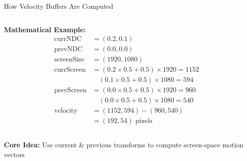 \documentclass[aspectratio=169]{beamer}
\begin{document}
\begin{frame}[fragile,shrink=2]{How Velocity Buffers Are Computed}
\begin{columns}[t]
        \begin{column}{0.36\textwidth}  %
            \textbf{\scriptsize Mathematical Example:}
            \vspace{0.1cm}
            {\scriptsize
            \begin{align*}
                \text{currNDC} &= (0.2, 0.1) \\
                \text{prevNDC} &= (0.0, 0.0) \\
                \text{screenSize} &= (1920, 1080) \\[0.05cm]
                \text{currScreen} &= (0.2 \times 0.5 + 0.5) \times 1920 = 1152 \\
                &\quad (0.1 \times 0.5 + 0.5) \times 1080 = 594 \\[0.05cm]
                \text{prevScreen} &= (0.0 \times 0.5 + 0.5) \times 1920 = 960 \\
                &\quad (0.0 \times 0.5 + 0.5) \times 1080 = 540 \\[0.05cm]
                \text{velocity} &= (1152, 594) - (960, 540) \\
                &= (192, 54) \text{ pixels}
            \end{align*}
            }
        \end{column}
    \end{columns}
    
    \vspace{0.3cm}
    
    \begin{center}
        \colorbox{yellow!15}{\parbox{12cm}{\centering\Large
            \textbf{Core Idea:} Use current \& previous transforms to compute screen-space motion vectors
        }}
    \end{center}
    
\end{frame}
\end{document}
